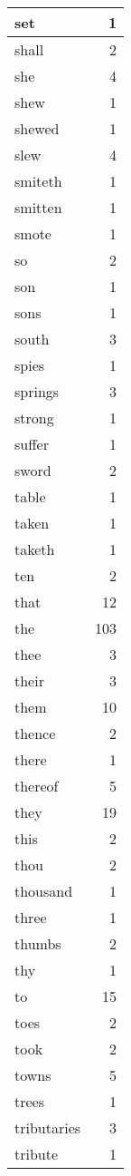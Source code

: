 \begin{center}
\begin{longtable}{l|r}
set & 1 \\ \hline
shall & 2 \\ \hline
she & 4 \\ \hline
shew & 1 \\ \hline
shewed & 1 \\ \hline
slew & 4 \\ \hline
smiteth & 1 \\ \hline
smitten & 1 \\ \hline
smote & 1 \\ \hline
so & 2 \\ \hline
son & 1 \\ \hline
sons & 1 \\ \hline
south & 3 \\ \hline
spies & 1 \\ \hline
springs & 3 \\ \hline
strong & 1 \\ \hline
suffer & 1 \\ \hline
sword & 2 \\ \hline
table & 1 \\ \hline
taken & 1 \\ \hline
taketh & 1 \\ \hline
ten & 2 \\ \hline
that & 12 \\ \hline
the & 103 \\ \hline
thee & 3 \\ \hline
their & 3 \\ \hline
them & 10 \\ \hline
thence & 2 \\ \hline
there & 1 \\ \hline
thereof & 5 \\ \hline
they & 19 \\ \hline
this & 2 \\ \hline
thou & 2 \\ \hline
thousand & 1 \\ \hline
three & 1 \\ \hline
thumbs & 2 \\ \hline
thy & 1 \\ \hline
to & 15 \\ \hline
toes & 2 \\ \hline
took & 2 \\ \hline
towns & 5 \\ \hline
trees & 1 \\ \hline
tributaries & 3 \\ \hline
tribute & 1 \\ \hline

\end{longtable}
\end{center}
